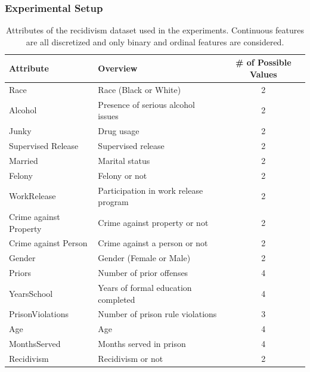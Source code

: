 \documentclass[runningheads]{llncs}
\begin{document}
\subsubsection{Experimental Setup}\label{sec:exp_setting}
{%
	\renewcommand{\arraystretch}{1.05}
	\begin{table}[tbp]
		\centering
		\caption{%
			Attributes of the recidivism dataset used in the experiments.
			Continuous features are all discretized
			and only binary and ordinal features are considered.
		}\label{tab:rcdv}
		\begin{tabular}{llc}
			\toprule
			Attribute              & Overview                              & \# of Possible Values \\
			\midrule
			Race                   & Race (Black or White)                 & 2                     \\
			Alcohol                & Presence of serious alcohol issues    & 2                     \\
			Junky                  & Drug usage                            & 2                     \\
			Supervised Release     & Supervised release                    & 2                     \\
			Married                & Marital status                        & 2                     \\
			Felony                 & Felony or not                         & 2                     \\
			WorkRelease            & Participation in work release program & 2                     \\
			Crime against Property & Crime against property or not         & 2                     \\
			Crime against Person   & Crime against a person or not         & 2                     \\
			Gender                 & Gender (Female or Male)               & 2                     \\
			Priors                 & Number of prior offenses              & 4                     \\
			YearsSchool            & Years of formal education completed   & 4                     \\
			PrisonViolations       & Number of prison rule violations      & 3                     \\
			Age                    & Age                                   & 4                     \\
			MonthsServed           & Months served in prison               & 4                     \\
			\midrule
			Recidivism             & Recidivism or not                     & 2                     \\
			\bottomrule
		\end{tabular}
	\end{table}
}
\end{document}
